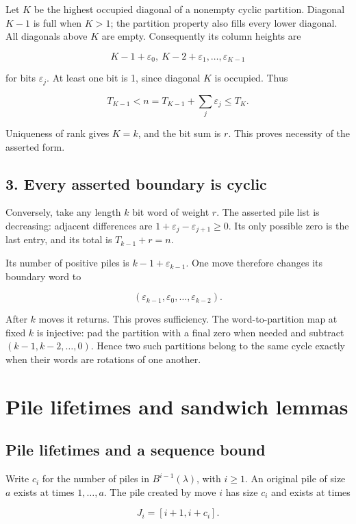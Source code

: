 \documentclass[11pt,a4paper]{article}
\begin{document}
Let $K$ be the highest occupied diagonal of a nonempty cyclic partition. Diagonal $K-1$ is full when $K>1$; the partition property also fills every lower diagonal. All diagonals above $K$ are empty. Consequently its column heights are

\[
K-1+\varepsilon_0,\ K-2+\varepsilon_1,\ldots,\varepsilon_{K-1}
\]

for bits $\varepsilon_j$. At least one bit is 1, since diagonal $K$ is occupied. Thus

\[
T_{K-1}<n=T_{K-1}+\sum_j\varepsilon_j\le T_K.
\]

Uniqueness of rank gives $K=k$, and the bit sum is $r$. This proves necessity of the asserted form.

\subsection{3. Every asserted boundary is cyclic}

Conversely, take any length $k$ bit word of weight $r$. The asserted pile list is decreasing: adjacent differences are $1+\varepsilon_j-\varepsilon_{j+1}\ge0$. Its only possible zero is the last entry, and its total is $T_{k-1}+r=n$.

Its number of positive piles is $k-1+\varepsilon_{k-1}$. One move therefore changes its boundary word to

\[
(\varepsilon_{k-1},\varepsilon_0,\ldots,\varepsilon_{k-2}).
\]

After $k$ moves it returns. This proves sufficiency. The word-to-partition map at fixed $k$ is injective: pad the partition with a final zero when needed and subtract $(k-1,k-2,\ldots,0)$. Hence two such partitions belong to the same cycle exactly when their words are rotations of one another.

\section{Pile lifetimes and sandwich lemmas}
\subsection{Pile lifetimes and a sequence bound}

Write $c_i$ for the number of piles in $B^{i-1}(\lambda)$, with $i\ge1$. An original pile of size $a$ exists at times $1,\ldots,a$. The pile created by move $i$ has size $c_i$ and exists at times

\[
J_i=[i+1,i+c_i].
\]
\end{document}
